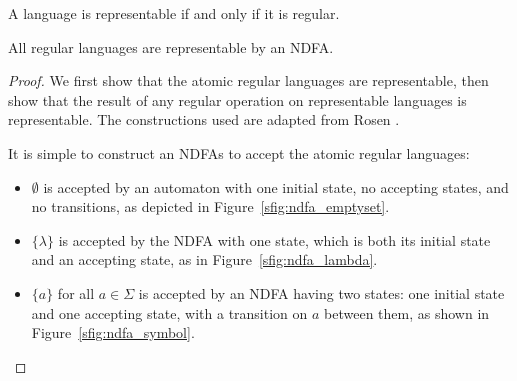 \documentclass{bcthesis}
\newcommand{\footcite}[2]{\xspace\cite[pg.~{#2}]{#1}\xspace}
\begin{document}
\label{ch:kleenes_theorem}

	\begin{theorem}
		A language is representable if and only if it is regular.
	\end{theorem}

	\begin{claim}
	\label{prop:regular_languages_representable}
		All regular languages are representable by an NDFA.
	\end{claim}
	\begin{proof}
		We first show that the atomic regular languages are representable, then show that the result of any regular operation on representable languages is representable. The constructions used are adapted from Rosen \footcite{rosen}{880--881}.

		It is simple to construct an NDFAs to accept the atomic regular languages:
		\begin{itemize}
			\item [] $\emptyset$ is accepted by an automaton with one initial state, no accepting states, and no transitions, as depicted in Figure~\ref{sfig:ndfa_emptyset}.
			\item [] $\{ \lambda \}$ is accepted by the NDFA with one state, which is both its initial state and an accepting state, as in Figure~\ref{sfig:ndfa_lambda}.
			\item [] $\{ a \}$ for all $a \in \Sigma$ is accepted by an NDFA having two states: one initial state and one accepting state, with a transition on $a$ between them, as shown in Figure~\ref{sfig:ndfa_symbol}.
		\end{itemize}



\end{proof}
\end{document}
